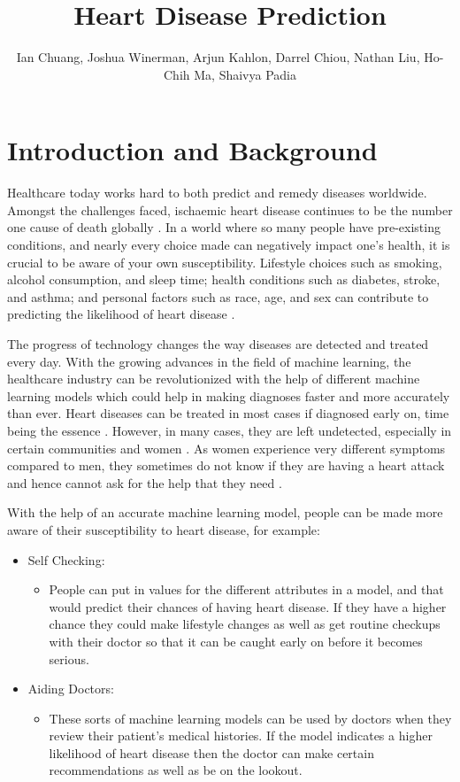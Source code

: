 \documentclass[a4paper]{article}
\title {Heart Disease Prediction}
\author{Ian Chuang, Joshua Winerman, Arjun Kahlon, Darrel Chiou, Nathan Liu, Ho-Chih Ma, Shaivya Padia}
\affil{https://github.com/ian-chuang/Heart-Disease-Prediction}
\date{}
\begin{document}
\maketitle
\vspace{6pt}


\section{Introduction and Background}

Healthcare today works hard to both predict and remedy diseases worldwide. Amongst the challenges faced, ischaemic heart disease continues to be the number one cause of death globally \cite{death}. In a world where so many people have pre-existing conditions, and nearly every choice made can negatively impact one’s health, it is crucial to be aware of your own susceptibility. Lifestyle choices such as smoking, alcohol consumption, and sleep time; health conditions such as diabetes, stroke, and asthma; and personal factors such as race, age, and sex can contribute to predicting the likelihood of heart disease \cite{mayoclinic}.

The progress of technology changes the way diseases are detected and treated every day. With the growing advances in the field of machine learning, the healthcare industry can be revolutionized with the help of different machine learning models which could help in making diagnoses faster and more accurately than ever. Heart diseases can be treated in most cases if diagnosed early on, time being the essence \cite{mayoclinic}. However, in many cases, they are left undetected, especially in certain communities and women \cite{minorities}. As women experience very different symptoms compared to men, they sometimes do not know if they are having a heart attack and hence cannot ask for the help that they need \cite{women}.  

With the help of an accurate machine learning model, people can be made more aware of their susceptibility to heart disease, for example: 


\begin{itemize}
   \item Self Checking:
   \begin{itemize}
     \item People can put in values for the different attributes in a model, and that would predict their chances of having heart disease. If they have a higher chance they could make lifestyle changes as well as get routine checkups with their doctor so that it can be caught early on before it becomes serious.
   \end{itemize}
   \item Aiding Doctors:
   \begin{itemize}
     \item These sorts of machine learning models can be used by doctors when they review their patient’s medical histories. If the model indicates a higher likelihood of heart disease then the doctor can make certain recommendations as well as be on the lookout. 
   \end{itemize}
 \end{itemize}
\end{document}
